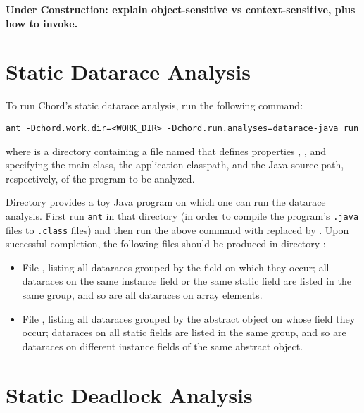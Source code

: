 {\bf Under Construction: explain object-sensitive vs context-sensitive, plus how
to invoke.}

\section{Static Datarace Analysis}

To run Chord's static datarace analysis, run the following command:

\begin{framed}
\begin{verbatim}
ant -Dchord.work.dir=<WORK_DIR> -Dchord.run.analyses=datarace-java run
\end{verbatim}
\end{framed}

where  is a directory containing a file named
 that defines properties ,
, and  specifying the main class,
the application classpath, and the Java source path, respectively, of the
program to be analyzed.

Directory  provides a toy Java
program on which one can run the datarace analysis.  First run {\tt ant} in that
directory (in order to compile the program's {\tt .java} files to {\tt .class}
files) and then run the above command with  replaced by
.  Upon successful completion, the following files
should be produced in directory :

\begin{itemize}
\item
File , listing all dataraces grouped by the field on
which they occur; all dataraces on the same instance field or the same static
field are listed in the same group, and so are all dataraces on array elements.
\item
File , listing all dataraces grouped by the abstract
object on whose field they occur; dataraces on all static fields are listed in
the same group, and so are dataraces on different instance fields of the same
abstract object.
\end{itemize}

\section{Static Deadlock Analysis}


